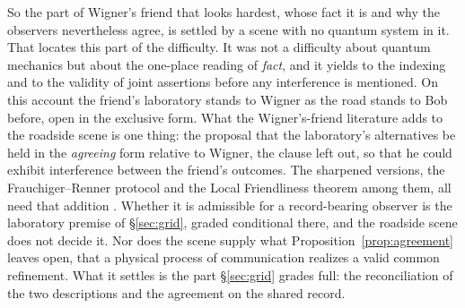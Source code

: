So the part of Wigner's friend that looks hardest, whose fact it is and why the observers nevertheless agree, is settled by a scene with no quantum system in it. That locates this part of the difficulty. It was not a difficulty about quantum mechanics but about the one-place reading of \emph{fact}, and it yields to the indexing and to the validity of joint assertions before any interference is mentioned. On this account the friend's laboratory stands to Wigner as the road stands to Bob before, open in the exclusive form. What the Wigner's-friend literature adds to the roadside scene is one thing: the proposal that the laboratory's alternatives be held in the \emph{agreeing} form relative to Wigner, the clause left out, so that he could exhibit interference between the friend's outcomes. The sharpened versions, the Frauchiger--Renner protocol and the Local Friendliness theorem among them, all need that addition \cite{frauchiger2018quantum, bong2020strong}. Whether it is admissible for a record-bearing observer is the laboratory premise of \S\ref{sec:grid}, graded conditional there, and the roadside scene does not decide it. Nor does the scene supply what Proposition~\ref{prop:agreement} leaves open, that a physical process of communication realizes a valid common refinement. What it settles is the part \S\ref{sec:grid} grades full: the reconciliation of the two descriptions and the agreement on the shared record.

